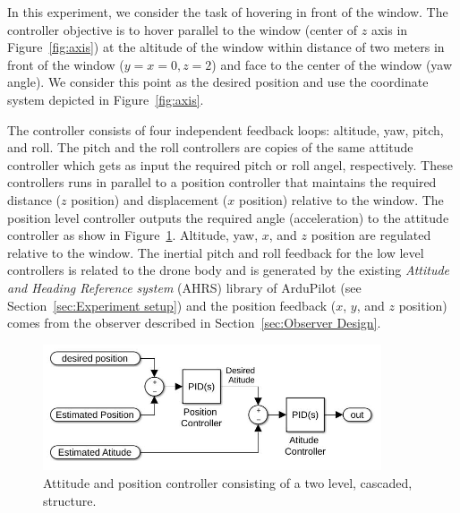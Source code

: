 \documentclass[ twoside, 12pt ]{article}
\begin{document}
In this experiment, we consider the task of hovering in front of the window. The controller objective is to hover parallel to the window (center of $z$ axis in Figure~\ref{fig:axis}) at the altitude of the window within distance of two meters in front of the window ($y=x=0 , z=2$) and face to the center of the window (yaw angle).
We consider this point as the desired position and use the coordinate system depicted in Figure~\ref{fig:axis}.

The controller consists of four independent feedback loops: altitude, yaw, pitch, and roll.
The pitch and the roll controllers are copies of the same attitude controller which gets as input the required pitch or roll angel, respectively. These controllers runs in parallel to a position controller that maintains the required distance ($z$ position) and displacement ($x$ position) relative to the window. The position level controller outputs the required angle (acceleration) to the attitude controller as show in Figure~\ref{fig:controllerStracture}.
Altitude, yaw, $x$, and $z$ position are regulated relative to the window.
The inertial pitch and roll feedback for the low level controllers is related to the drone body and is generated by the existing \textit{Attitude and Heading Reference system} (AHRS) library of ArduPilot (see Section~\ref{sec:Experiment setup}) and the position feedback ($x$, $y$, and $z$ position) comes from the observer described in Section~\ref{sec:Observer Design}.

\begin{figure} %
    \centerline{\includegraphics[width=100mm]{two_level_controller.jpg}}
    \caption{Attitude and position controller consisting of a two level, cascaded, structure.}
    \label{fig:controllerStracture}
\end{figure}
\end{document}
